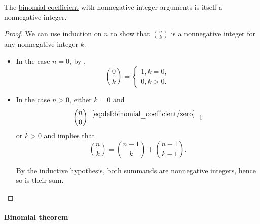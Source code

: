\begin{corollary}\label{thm:binomial_coefficient_is_integer}
  The \hyperref[def:binomial_coefficient]{binomial coefficient} with nonnegative integer arguments is itself a nonnegative integer.
\end{corollary}
\begin{proof}
  We can use induction on \( n \) to show that \( \binom n k \) is a nonnegative integer for any nonnegative integer \( k \).
  \begin{itemize}
    \item In the case \( n = 0 \), by ,
    \begin{equation*}
      \binom 0 k = \begin{cases}
        1, k = 0, \\
        0, k > 0.
      \end{cases}
    \end{equation*}

    \item In the case \( n > 0 \), either \( k = 0 \) and
    \begin{equation*}
      \binom n 0 \reloset {\eqref{eq:def:binomial_coefficient/zero}} = 1
    \end{equation*}
    or \( k > 0 \) and  implies that
    \begin{equation*}
      \binom n k
      =
      \binom {n - 1} k + \binom {n - 1} {k - 1}.
    \end{equation*}

    By the inductive hypothesis, both summands are nonnegative integers, hence so is their sum.
  \end{itemize}
\end{proof}

\paragraph{Binomial theorem}

